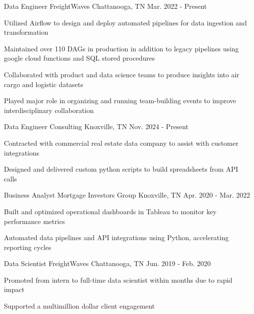 
\begin{cventries}
  \cventry
    {Data Engineer} %
    {FreightWaves} %
    {Chattanooga, TN} %
    {Mar. 2022 - Present} %
    {
      \begin{cvitems} %
        \item {Utilized Airflow to design and deploy automated pipelines for data ingestion and transformation}
        \item {Maintained over 110 DAGs in production in addition to legacy pipelines using google cloud functions and SQL stored procedures }
        \item {Collaborated with product and data science teams to produce insights into air cargo and logistic datasets}
        \item {Played major role in organizing and running team-building events to improve interdisciplinary collaboration}
      \end{cvitems}
    }
  
  \cventry
      {Data Engineer}
      {Consulting}
      {Knoxville, TN}
      {Nov. 2024 - Present}
      {
        \begin{cvitems}
          \item {Contracted with commercial real estate data company to assist with customer integrations }
          \item {Designed and delivered custom python scripts to build spreadsheets from API calls}
        \end{cvitems}
      }
      
  \cventry
    {Business Analyst} %
    {Mortgage Investors Group} %
    {Knoxville, TN} %
    {Apr. 2020 - Mar. 2022} %
    {
      \begin{cvitems} %
        \item Built and optimized operational dashboards in Tableau to monitor key performance metrics
        \item Automated data pipelines and API integrations using Python, accelerating reporting cycles
      \end{cvitems}
    }
    
  \cventry
    {Data Scientist} %
    {FreightWaves} %
    {Chattanooga, TN} %
    {Jun. 2019 - Feb. 2020} %
    {
      \begin{cvitems} %
        \item {Promoted from intern to full-time data scientist within months due to rapid impact}
        \item {Supported a multimillion dollar client engagement}
      \end{cvitems}
    }

\end{cventries}
